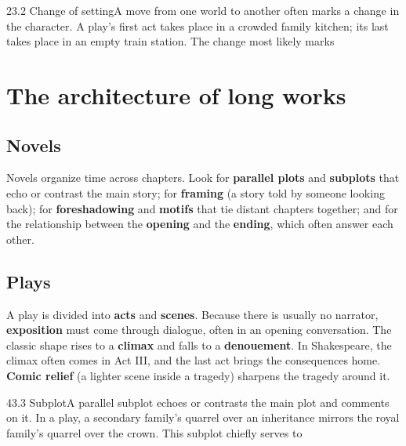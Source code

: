 \documentclass[11pt]{article}
\begin{document}
\begin{q}{2}{3.2 Change of setting}{A move from one world to another often marks a change in the character.}
A play's first act takes place in a crowded family kitchen; its last takes place in an empty train station. The change most likely marks
\end{q}

\section{The architecture of long works}
\label{sec:3}

\subsection{Novels}
Novels organize time across chapters. Look for \textbf{parallel plots} and \textbf{subplots} that echo or contrast the main story; for \textbf{framing} (a story told by someone looking back); for \textbf{foreshadowing} and \textbf{motifs} that tie distant chapters together; and for the relationship between the \textbf{opening} and the \textbf{ending}, which often answer each other.

\subsection{Plays}
A play is divided into \textbf{acts} and \textbf{scenes}. Because there is usually no narrator, \textbf{exposition} must come through dialogue, often in an opening conversation. The classic shape rises to a \textbf{climax} and falls to a \textbf{denouement}. In Shakespeare, the climax often comes in Act III, and the last act brings the consequences home. \textbf{Comic relief} (a lighter scene inside a tragedy) sharpens the tragedy around it.

\begin{q}{4}{3.3 Subplot}{A parallel subplot echoes or contrasts the main plot and comments on it.}
In a play, a secondary family's quarrel over an inheritance mirrors the royal family's quarrel over the crown. This subplot chiefly serves to
\end{q}
\end{document}
